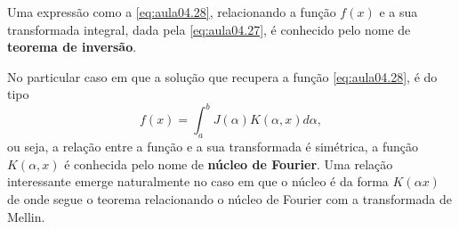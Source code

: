 Uma expressão como a \autoref{eq:aula04.28}, relacionando a função $f(x)$ e a sua transformada integral, dada pela \autoref{eq:aula04.27}, é conhecido pelo nome de \textbf{teorema de inversão}.

No particular caso em que a solução que recupera a função \autoref{eq:aula04.28}, é do tipo
\begin{equation}\label{eq:aula04.29}
f(x) =
\int_{a}^{b} J(\alpha) K(\alpha, x) d\alpha,
\end{equation}
ou seja, a relação entre a função e a sua transformada é simétrica, a função $K(\alpha , x)$ é conhecida pelo nome de \textbf{núcleo de Fourier}. Uma relação interessante emerge naturalmente no caso em que o núcleo é da forma $K(\alpha x)$ de onde segue o teorema relacionando o núcleo de Fourier com a transformada de Mellin.


